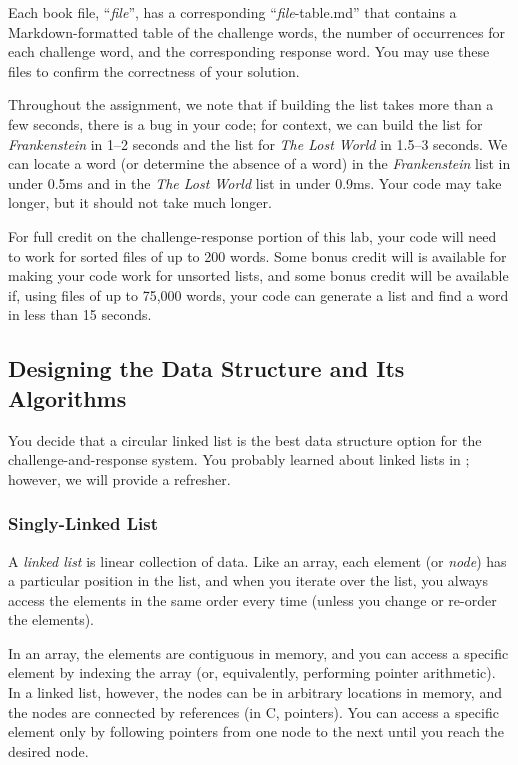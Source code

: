 Each book file, ``\textit{file}'', has a corresponding ``\textit{file}-table.md'' that contains a Markdown-formatted table of the challenge words, the number of occurrences for each challenge word, and the corresponding response word.
You may use these files to confirm the correctness of your solution.

Throughout the assignment, we note that if building the list takes more than a few seconds, there is a bug in your code;
for context, we can build the list for \textit{Frankenstein} in 1--2 seconds and the list for \textit{The Lost World} in 1.5--3 seconds.
We can locate a word (or determine the absence of a word) in the \textit{Frankenstein} list in under 0.5ms and in the \textit{The Lost World} list in under 0.9ms.
Your code may take longer, but it should not take much longer.

For full credit on the challenge-response portion of this lab, your code will need to work for sorted files of up to 200 words.
Some bonus credit will is available for making your code work for unsorted lists, and some bonus credit will be available if, using files of up to 75,000 words, your code can generate a list and find a word in less than 15 seconds.

\subsection{Designing the Data Structure and Its Algorithms}

You decide that a circular linked list is the best data structure option for the challenge-and-response system.
You probably learned about linked lists in \cstwo; however, we will provide a refresher.

\subsubsection{Singly-Linked List} \label{subsubsec:singlylinkedlist}

A \textit{linked list} is linear collection of data.
Like an array, each element (or \textit{node}) has a particular position in the list, and when you iterate over the list, you always access the elements in the same order every time (unless you change or re-order the elements).

In an array, the elements are contiguous in memory, and you can access a specific element by indexing the array (or, equivalently, performing pointer arithmetic).
In a linked list, however, the nodes can be in arbitrary locations in memory, and the nodes are connected by references (in C, pointers).
You can access a specific element only by following pointers from one node to the next until you reach the desired node.

